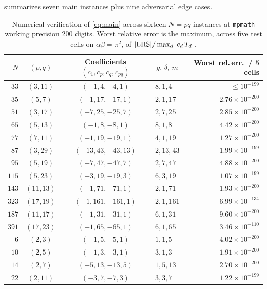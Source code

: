\documentclass[11pt,reqno]{amsart}
\theoremstyle{definition}
\begin{document}
 summarizes seven main instances plus nine
adversarial edge cases.

\begin{table}[h]
\centering
\small
\setlength{\tabcolsep}{5pt}
\begin{tabular}{rcclr}
\toprule
$N$ & $(p, q)$ & Coefficients $(c_1, c_p, c_q, c_{pq})$
& $\,g,\, \delta,\, m\,$ & Worst rel.\,err.\ / 5 cells \\
\midrule
$33$  & $(3, 11)$  & $(-1, 4, -4, 1)$       & $8, 1, 4$    & $\le 10^{-199}$ \\
$35$  & $(5, 7)$   & $(-1, 17, -17, 1)$     & $2, 1, 17$   & $2.76\times 10^{-200}$ \\
$51$  & $(3, 17)$  & $(-7, 25, -25, 7)$     & $2, 7, 25$   & $2.85\times 10^{-200}$ \\
$65$  & $(5, 13)$  & $(-1, 8, -8, 1)$       & $8, 1, 8$    & $4.42\times 10^{-200}$ \\
$77$  & $(7, 11)$  & $(-1, 19, -19, 1)$     & $4, 1, 19$   & $1.27\times 10^{-200}$ \\
$87$  & $(3, 29)$  & $(-13, 43, -43, 13)$   & $2, 13, 43$  & $1.99\times 10^{-199}$ \\
$95$  & $(5, 19)$  & $(-7, 47, -47, 7)$     & $2, 7, 47$   & $4.88\times 10^{-200}$ \\
$115$ & $(5, 23)$  & $(-3, 19, -19, 3)$     & $6, 3, 19$   & $1.07\times 10^{-199}$ \\
$143$ & $(11, 13)$ & $(-1, 71, -71, 1)$     & $2, 1, 71$   & $1.93\times 10^{-200}$ \\
$323$ & $(17, 19)$ & $(-1, 161, -161, 1)$   & $2, 1, 161$  & $6.99\times 10^{-134}$ \\
$187$ & $(11, 17)$ & $(-1, 31, -31, 1)$     & $6, 1, 31$   & $9.60\times 10^{-200}$ \\
$391$ & $(17, 23)$ & $(-1, 65, -65, 1)$     & $6, 1, 65$   & $3.46\times 10^{-110}$ \\
$6$   & $(2, 3)$   & $(-1, 5, -5, 1)$       & $1, 1, 5$    & $4.02\times 10^{-200}$ \\
$10$  & $(2, 5)$   & $(-1, 3, -3, 1)$       & $3, 1, 3$    & $1.91\times 10^{-200}$ \\
$14$  & $(2, 7)$   & $(-5, 13, -13, 5)$     & $1, 5, 13$   & $2.70\times 10^{-200}$ \\
$22$  & $(2, 11)$  & $(-3, 7, -7, 3)$       & $3, 3, 7$    & $1.22\times 10^{-199}$ \\
\bottomrule
\end{tabular}
\medskip
\caption{Numerical verification of \cref{eq:main} across sixteen
$N = pq$ instances at \texttt{mpmath} working precision $200$ digits.
Worst relative error is the maximum, across five test cells on
$\alpha\beta = \pi^2$, of $|{\rm LHS}|/\max_d|c_d\,T_d|$.}
\label{tab:verification}
\end{table}
\end{document}
